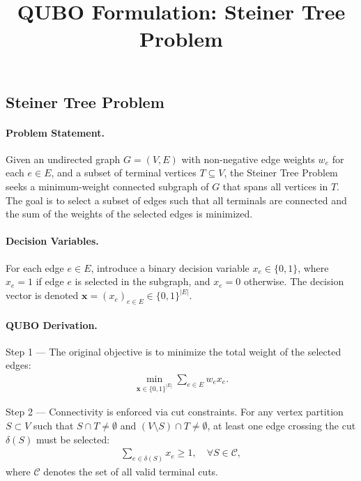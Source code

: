 \documentclass[12pt]{article}
\title{QUBO Formulation: Steiner Tree Problem}
\date{}
\begin{document}
\maketitle

\subsection*{Steiner Tree Problem}

\paragraph{Problem Statement.}
Given an undirected graph $G = (V, E)$ with non-negative edge weights $w_e$ for each $e \in E$, and a subset of terminal vertices $T \subseteq V$, the Steiner Tree Problem seeks a minimum-weight connected subgraph of $G$ that spans all vertices in $T$. The goal is to select a subset of edges such that all terminals are connected and the sum of the weights of the selected edges is minimized.

\paragraph{Decision Variables.}
For each edge $e \in E$, introduce a binary decision variable $x_e \in \{0,1\}$, where $x_e = 1$ if edge $e$ is selected in the subgraph, and $x_e = 0$ otherwise. The decision vector is denoted $\mathbf{x} = (x_e)_{e \in E} \in \{0,1\}^{|E|}$.

\paragraph{QUBO Derivation.}
Step 1 --- The original objective is to minimize the total weight of the selected edges:
\begin{align}
\min_{\mathbf{x} \in \{0,1\}^{|E|}} \sum_{e \in E} w_e x_e.
\end{align}

Step 2 --- Connectivity is enforced via cut constraints. For any vertex partition $S \subset V$ such that $S \cap T \neq \emptyset$ and $(V \setminus S) \cap T \neq \emptyset$, at least one edge crossing the cut $\delta(S)$ must be selected:
\begin{align}
\sum_{e \in \delta(S)} x_e \ge 1, \quad \forall S \in \mathcal{C},
\end{align}
where $\mathcal{C}$ denotes the set of all valid terminal cuts.
\end{document}
